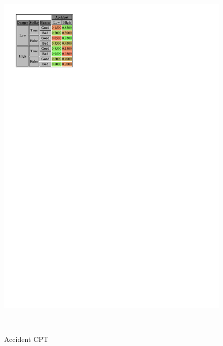\documentclass[a4paper,12pt]{article} %
\begin{document}
\begin{figure}[H]
\begin{center}
	\centering
	\begin{minipage}[c]{.45\textwidth}
		\centering
		\includegraphics[width=.9\linewidth]{../code/accident.pdf}	
		\caption*{Accident CPT}
		\label{fig:accident}
	\end{minipage}
	~
	\begin{minipage}[c]{.45\textwidth}
		\centering

\end{minipage}
\end{center}
\end{figure}
\end{document}
